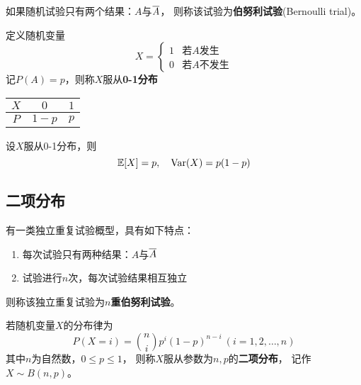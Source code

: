 \begin{definition}[伯努利试验]
  如果随机试验只有两个结果：$A$与$\overline{A}$，
  则称该试验为\textbf{伯努利试验}(Bernoulli trial)。
\end{definition}

\begin{definition}[0-1分布]
  定义随机变量
  \begin{displaymath}
    X = \begin{cases}
      1 & \text{若$A$发生} \\
      0 & \text{若$A$不发生}
    \end{cases}
  \end{displaymath}
  记$P(A)=p$，则称$X$服从\textbf{0-1分布}
  \begin{center}
    \begin{tabular}{c|cc}
      $X$ & $0$ & $1$ \\
      \hline
      $P$ & $1-p$ & $p$ \\
      \end{tabular}
  \end{center}
\end{definition}

\begin{theorem}[0-1分布的数字特征]
  设$X$服从0-1分布，则
  \begin{displaymath}
    \mathbb{E}[X]=p,\quad \textrm{Var}(X) = p(1-p)
  \end{displaymath}
\end{theorem}

\subsection{二项分布}
\begin{definition}[$n$重伯努利试验]
  有一类独立重复试验概型，具有如下特点：
  \begin{enumerate}
    \item 每次试验只有两种结果：$A$与$\overline{A}$
    \item 试验进行$n$次，每次试验结果相互独立
  \end{enumerate}
  则称该独立重复试验为\textbf{$n$重伯努利试验}。
\end{definition}

\begin{definition}[二项分布]
  若随机变量$X$的分布律为
  \begin{displaymath}
    P(X=i) = \binom{n}{i}p^i(1-p)^{n-i}\ (i=1,2,\dots,n)
  \end{displaymath}
  其中$n$为自然数，$0\le p \le 1$，
  则称$X$服从参数为$n,p$的\textbf{二项分布}，
  记作$X\sim B(n,p)$。
\end{definition}

